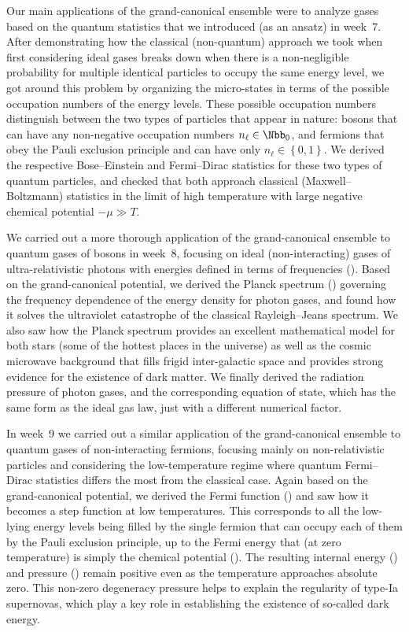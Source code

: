Our main applications of the grand-canonical ensemble were to analyze gases based on the quantum statistics that we introduced (as an ansatz) in week~7.
After demonstrating how the classical (non-quantum) approach we took when first considering ideal gases breaks down when there is a non-negligible probability for multiple identical particles to occupy the same energy level, we got around this problem by organizing the micro-states in terms of the possible occupation numbers of the energy levels.
These possible occupation numbers distinguish between the two types of particles that appear in nature: bosons that can have any non-negative occupation numbers $n_{\ell} \in \Nbb_0$, and fermions that obey the Pauli exclusion principle and can have only $n_{\ell} \in \left\{0, 1\right\}$.
We derived the respective Bose--Einstein and Fermi--Dirac statistics for these two types of quantum particles, and checked that both approach classical (Maxwell--Boltzmann) statistics in the limit of high temperature with large negative chemical potential $-\mu \gg T$.

We carried out a more thorough application of the grand-canonical ensemble to quantum gases of bosons in week~8, focusing on ideal (non-interacting) gases of ultra-relativistic photons with energies defined in terms of frequencies ().
Based on the grand-canonical potential, we derived the Planck spectrum () governing the frequency dependence of the energy density for photon gases, and found how it solves the ultraviolet catastrophe of the classical Rayleigh--Jeans spectrum.
We also saw how the Planck spectrum provides an excellent mathematical model for both stars (some of the hottest places in the universe) as well as the cosmic microwave background that fills frigid inter-galactic space and provides strong evidence for the existence of dark matter.
We finally derived the radiation pressure of photon gases, and the corresponding equation of state, which has the same form as the ideal gas law, just with a different numerical factor.

In week~9 we carried out a similar application of the grand-canonical ensemble to quantum gases of non-interacting fermions, focusing mainly on non-relativistic particles and considering the low-temperature regime where quantum Fermi--Dirac statistics differs the most from the classical case.
Again based on the grand-canonical potential, we derived the Fermi function () and saw how it becomes a step function at low temperatures.
This corresponds to all the low-lying energy levels being filled by the single fermion that can occupy each of them by the Pauli exclusion principle, up to the Fermi energy that (at zero temperature) is simply the chemical potential ().
The resulting internal energy () and pressure () remain positive even as the temperature approaches absolute zero.
This non-zero degeneracy pressure helps to explain the regularity of type-Ia supernovas, which play a key role in establishing the existence of so-called dark energy.

